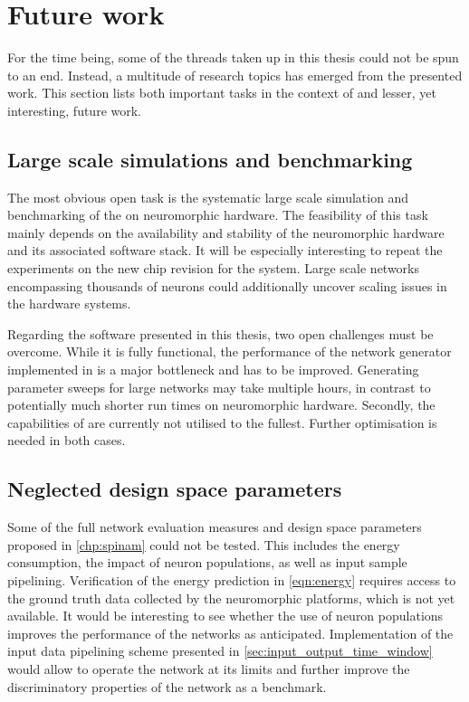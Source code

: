 \section{Future work}

For the time being, some of the threads taken up in this thesis could not be spun to an end. Instead, a multitude of research topics has emerged from the presented work. This section lists both important tasks in the context of \HBP and lesser, yet interesting, future work.

\subsection{Large scale simulations and benchmarking}
The most obvious open task is the systematic large scale simulation and benchmarking of the \BiNAM on neuromorphic hardware. The feasibility of this task mainly depends on the availability and stability of the neuromorphic hardware and its associated software stack. It will be especially interesting to repeat the experiments on the new \HICANN chip revision for the \NMPM system. Large scale networks encompassing thousands of neurons could additionally uncover scaling issues in the hardware systems. 

Regarding the software presented in this thesis, two open challenges must be overcome. While it is fully functional, the performance of the \BiNAM network generator implemented in \PyNAM is a major bottleneck and has to be improved. Generating parameter sweeps for large networks may take multiple hours, in contrast to potentially much shorter run times on neuromorphic hardware. Secondly, the capabilities of \NMMC are currently not utilised to the fullest. Further optimisation is needed in both cases.

\subsection{Neglected design space parameters}

Some of the full network evaluation measures and design space parameters proposed in \cref{chp:spinam} could not be tested. This includes the energy consumption, the impact of neuron populations, as well as input sample pipelining. Verification of the energy prediction in \cref{eqn:energy} requires access to the ground truth data collected by the neuromorphic platforms, which is not yet available. It would be interesting to see whether the use of neuron populations improves the performance of the networks as anticipated. Implementation of the input data pipelining scheme presented in \cref{sec:input_output_time_window} would allow to operate the network at its limits and further improve the discriminatory properties of the network as a benchmark.

